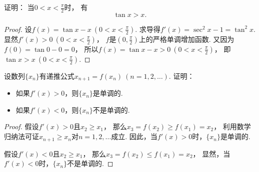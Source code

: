 \begin{example}
证明：
当\(0<x<\frac\pi2\)时，
有\begin{equation}\label{equation:单调性.正切不等式}
	\tan x > x.
\end{equation}
\begin{proof}
设\(f(x) = \tan x - x\ (0<x<\frac\pi2)\).
求导得\(f'(x) = \sec^2 x - 1 = \tan^2 x\).
显然\(f'(x) > 0\ (0<x<\frac\pi2)\)，
\(f\)是\((0,\frac\pi2)\)上的严格单调增加函数.
又因为\(f(0) = \tan0 - 0 = 0\)，
所以\(f(x) = \tan x - x > 0\ (0<x<\frac\pi2)\)，
即\(\tan x > x\ (0<x<\frac\pi2)\).
\end{proof}
\end{example}

\begin{example}
设数列\(\{x_n\}\)有递推公式\(x_{n+1} = f(x_n)\ (n=1,2,\dotsc)\).
证明：\begin{itemize}
	\item 如果\(f'(x) > 0\)，则\(\{x_n\}\)是单调的.
	\item 如果\(f'(x) < 0\)，则\(\{x_n\}\)不是单调的.
\end{itemize}
\begin{proof}
假设\(f'(x) > 0\)且\(x_2 \geq x_1\)，
那么\(x_3 = f(x_2) \geq f(x_1) = x_2\)，
利用数学归纳法可证\(x_{n+1} \geq x_n\)对\(n=1,2,\dotsc\)成立.
因此，当\(f'(x) > 0\)时，\(\{x_n\}\)是单调的.

假设\(f'(x) < 0\)且\(x_2 \geq x_1\)，
那么\(x_3 = f(x_2) \leq f(x_1) = x_2\)，
显然，当\(f'(x) < 0\)时，\(\{x_n\}\)不是单调的.
\end{proof}
\end{example}

